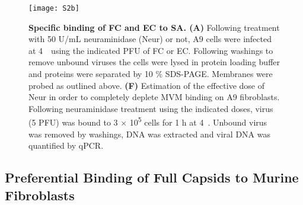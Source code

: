 \begin{figure}[H]
\begin{minipage}{\textwidth}
\centering
\texttt{[image: S2b]} \\[0.3cm]
\caption[Specific Binding of Full Capsids and Empty Capsids to Sialic Acid]{\textbf{Specific binding of FC and EC to SA. (A)} Following treatment with 50 U/mL neuraminidase (Neur) or not, A9 cells were infected at \mbox{4 \textcelsius}~using the indicated PFU of FC or EC\footnotemark. Following washings to remove unbound viruses the cells were lysed in protein loading buffer and proteins were separated by 10 \% SDS-PAGE. Membranes were probed as outlined above. \textbf{(F)} Estimation of the effective dose of Neur in order to completely deplete MVM binding on A9 fibroblasts. Following neuraminidase treatment using the indicated doses, virus (5 PFU) was bound to 3 $\times$ 10\textsuperscript{5} cells for 1 h at \mbox{4 \textcelsius}. Unbound virus was removed by washings, DNA was extracted and viral DNA was quantified by qPCR.}

\label{S2b}
\vspace{1cm}

\end{minipage}

\end{figure}



\subsection{Preferential Binding of Full Capsids to Murine Fibroblasts}


